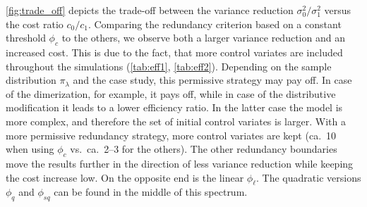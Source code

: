 \autoref{fig:trade_off} depicts the trade-off between the variance reduction $\sigma_0^2/\sigma_1^2$
versus the cost ratio $c_0/c_1$. Comparing the redundancy criterion based on a constant threshold
$\phi_c$ to the others,
we observe both a larger variance reduction and an increased cost. This is due to the fact, that
more control  variates are included throughout the simulations (\autoref{tab:eff1}, \autoref{tab:eff2}). Depending on the sample distribution $\pi_{\lambda}$
and the case study, this permissive strategy may pay off. In case of the dimerization, for example,
it pays off, while in case of the distributive modification it leads to a lower efficiency ratio.
In the latter case the model is more complex, and therefore the set of initial
control  variates is larger. With a more permissive redundancy strategy, more control  variates are kept
(ca.\ 10 when using $\phi_c$ vs.\ ca.\ 2--3 for the others).
The other redundancy boundaries move the results further in the direction of less variance reduction
while keeping the cost increase low.
On the opposite end is the linear $\phi_{\ell}$.
The quadratic versions $\phi_{q}$ and $\phi_{\mathit{sq}}$ can be found in the middle of this spectrum.

